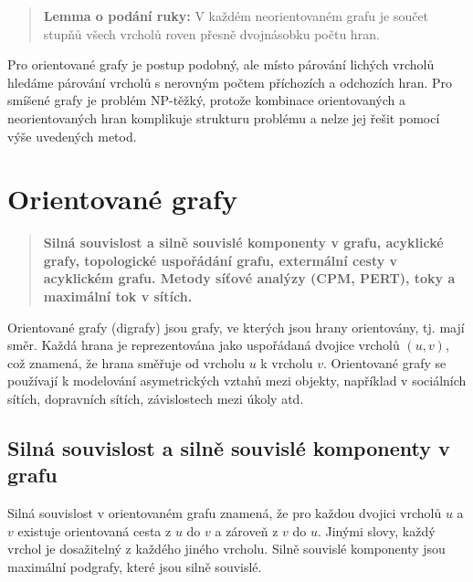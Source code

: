\begin{quote}
    \label{quote:podaniRuky}
\textbf{Lemma o podání ruky:} V každém neorientovaném grafu je součet stupňů všech vrcholů roven přesně dvojnásobku počtu hran.
\end{quote}
Pro orientované grafy je postup podobný, ale místo párování lichých vrcholů hledáme párování vrcholů s nerovným počtem příchozích a odchozích hran. Pro smíšené grafy je problém NP-těžký, protože kombinace orientovaných a neorientovaných hran komplikuje strukturu problému a nelze jej řešit pomocí výše uvedených metod.


\section{Orientované grafy}
\begin{quote}
\textbf{Silná souvislost a silně souvislé komponenty v grafu, acyklické grafy, topologické uspořádání grafu, extermální cesty v acyklickém grafu. Metody síťové analýzy (CPM, PERT), toky a maximální tok v sítích.}
\end{quote}

Orientované grafy (digrafy) jsou grafy, ve kterých jsou hrany orientovány, tj. mají 
směr. Každá hrana je reprezentována jako uspořádaná dvojice vrcholů $(u, v)$, což 
znamená, že hrana směřuje od vrcholu $u$ k vrcholu $v$. Orientované grafy se používají 
k modelování asymetrických vztahů mezi objekty, například v sociálních sítích, 
dopravních sítích, závislostech mezi úkoly atd.

\subsection{Silná souvislost a silně souvislé komponenty v grafu}
Silná souvislost v orientovaném grafu znamená, že pro každou dvojici vrcholů $u$ a $v$ 
existuje orientovaná cesta z $u$ do $v$ a zároveň z $v$ do $u$. Jinými slovy, každý 
vrchol je dosažitelný z každého jiného vrcholu. Silně souvislé komponenty 
jsou maximální podgrafy, které jsou silně souvislé.

